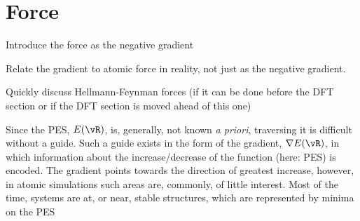 \section{Force}
\label{sec:force}

\bit
\item Introduce the force as the negative gradient
\item Relate the gradient to atomic force in reality, not just as the negative gradient.
\item Quickly discuss Hellmann-Feynman forces (if it can be done before the DFT section or if the DFT section is moved ahead of this one)
\eit

Since the PES, $E(\vR)$, is, generally, not known \textit{a priori}, traversing it is difficult without a guide.
Such a guide exists in the form of the gradient, $\nabla E(\vR)$, in which information about the increase/decrease of the function (here: PES) is encoded.
The gradient points towards the direction of greatest increase, however, in atomic simulations such areas are, commonly, of little interest.
Most of the time, systems are at, or near, stable structures, which are represented by minima on the PES \expand



